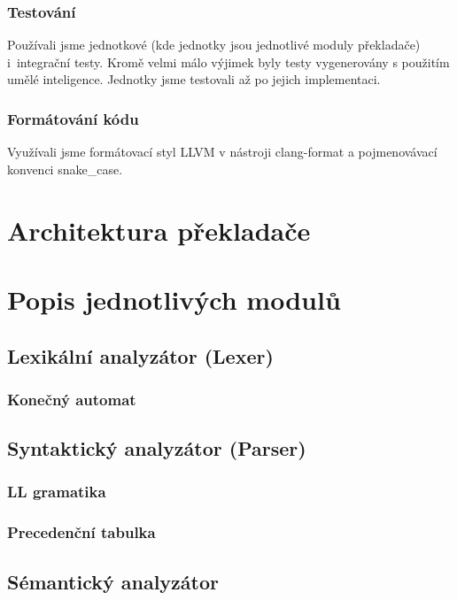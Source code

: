 \documentclass{article}
\begin{document}
            \subsubsection{Testování}
                Používali jsme jednotkové (kde jednotky jsou jednotlivé moduly překladače) i~integrační testy. Kromě velmi málo výjimek byly testy vygenerovány s použitím umělé inteligence. Jednotky jsme testovali až po jejich implementaci.
            \subsubsection{Formátování kódu}
                Využívali jsme formátovací styl LLVM v nástroji clang-format a pojmenovávací konvenci snake\_case.
                
    \newpage
    

    \section{Architektura překladače}
        
    
    \newpage


    \section{Popis jednotlivých modulů}
        \subsection{Lexikální analyzátor (Lexer)}
            \subsubsection{Konečný automat}

        \subsection{Syntaktický analyzátor (Parser)}
            \subsubsection{LL gramatika}
            \subsubsection{Precedenční tabulka}

        \subsection{Sémantický analyzátor}
            
\end{document}
